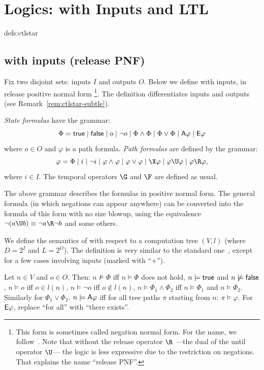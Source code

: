 \toclesslab\section{Logics: \CTLstar with Inputs and LTL}{defs:ctlstar}

\subsection*{\CTLstar with inputs (release PNF)}

Fix two disjoint sets: inputs $I$ and outputs $O$.
Below we define \CTLstar with inputs, in release positive normal form%
\footnote{This form is sometimes called negation normal form.
  For the name, we follow~\cite{PrinciplesMC}.
  Note that without the release operator $\R$%
  ---the dual of the until operator $\U$---%
  the logic is less expressive due to the restriction on negations.
  That explains the name ``release PNF''.}.
The definition differentiates inputs and outputs (see Remark~\ref{rem:ctlstar-subtle}).

\emph{State formulas} have the grammar:
$$
\Phi = \textsf{true} \mid \textsf{false} \mid
       o \mid \neg o \mid \Phi \land \Phi \mid \Phi \lor \Phi \mid
       {\ensuremath{\operatorname{\mathsf{A}}}} \varphi \mid {\ensuremath{\operatorname{\mathsf{E}}}} \varphi
$$
where $o \in O$ and $\varphi$ is a path formula. \emph{Path formulas} are defined by the grammar:
$$
\varphi = \Phi \|
      i \| \neg i \|
      \varphi \land \varphi \| \varphi \lor \varphi \|
      \X \varphi \|
      \varphi \U \varphi \|
      \varphi \R \varphi,
$$
where $i \in I$.
The temporal operators $\G$ and $\F$ are defined as usual.

The above grammar describes the \CTLstar formulas in positive normal form.
The general \CTLstar formula
(in which negations can appear anywhere)
can be converted into the formula of this form with no size blowup,
using the equivalence $\neg (a \U b) \equiv \neg a \R \neg b$ and some others.

We define the semantics of \CTLstar with respect to a computation tree $(V,l)$
(where $D=2^I$ and $L=2^O$).
The definition is very similar to the standard one~\cite{PrinciplesMC},
except for a few cases involving inputs
(marked with ``+'').

Let $n \in V$ and $o \in O$.
Then:
\li
\- $n \not\models \Phi$ iff $n \models \Phi$ does not hold,
\- $n \models \textsf{true}$ and $n \not\models \textsf{false}$,
\- $n \models o$ iff $o \in l(n)$, $n \models \neg o$ iff $o \not\in l(n)$,
\- $n \models \Phi_1 \land \Phi_2$ iff $n \models \Phi_1$ and $n \models \Phi_2$.
   Similarly for $\Phi_1\lor\Phi_2$.
\- $n \models {\ensuremath{\operatorname{\mathsf{A}}}} \varphi$ iff for all tree paths $\pi$ starting from $n$:
   $\pi \models \varphi$.
   For ${\operatorname{\mathsf{E}}}\varphi$, replace ``for all'' with ``there exists''.
\il

